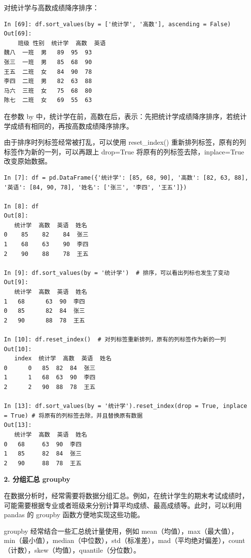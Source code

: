 对统计学与高数成绩降序排序：
\begin{lstlisting}[Language=Python]
In [69]: df.sort_values(by = ['统计学', '高数'], ascending = False)
Out[69]:
    班级 性别  统计学  高数  英语
魏八  一班  男   89  95  93
张三  一班  男   85  68  90
王五  二班  女   84  90  78
李四  二班  男   82  63  88
马六  三班  女   75  68  80
陈七  二班  女   69  55  63
\end{lstlisting}

在参数 by 中，统计学在前，高数在后，表示：先把统计学成绩降序排序，若统计学成绩有相同的，再按高数成绩降序排序。

由于排序时列标签经常被打乱，可以使用 reset\_index() 重新排列标签，原有的列标签作为新的一列，可以再跟上 drop=True 将原有的列标签去除，inplace=True 改变原始数据。

\begin{lstlisting}[Language=Python]
In [7]: df = pd.DataFrame({'统计学': [85, 68, 90], '高数': [82, 63, 88], '英语': [84, 90, 78], '姓名': ['张三', '李四', '王五']})

In [8]: df
Out[8]:
   统计学  高数  英语  姓名
0    85    82    84  张三
1    68    63    90  李四
2    90    88    78  王五

In [9]: df.sort_values(by = '统计学')  # 排序，可以看出列标也发生了变动
Out[9]:
   统计学  高数  英语  姓名
1   68      63  90  李四
0   85      82  84  张三
2   90      88  78  王五

In [10]: df.reset_index()  # 对列标签重新排列，原有的列标签作为新的一列
Out[10]:
   index  统计学  高数  英语  姓名
0      0   85  82  84  张三
1      1   68  63  90  李四
2      2   90  88  78  王五

In [13]: df.sort_values(by = '统计学').reset_index(drop = True, inplace = True) # 将原有的列标签去除，并且替换原有数据
Out[13]:
   统计学  高数  英语  姓名
0   68     63  90  李四
1   85     82  84  张三
2   90     88  78  王五
\end{lstlisting}

\vspace{3pt}
\noindent\textbf{2. 分组汇总 groupby}
\vspace{3pt}

在数据分析时，经常需要将数据分组汇总。例如，在统计学生的期末考试成绩时，可能需要根据专业或者班级来分别计算平均成绩、最高成绩等。此时，可以利用 pandas 的 groupby 函数方便地实现这些功能。



groupby 经常结合一些汇总统计量使用，例如 mean（均值），max（最大值），min（最小值），median（中位数），std（标准差），mad（平均绝对偏差），count（计数），skew（均值），quantile（分位数）。


